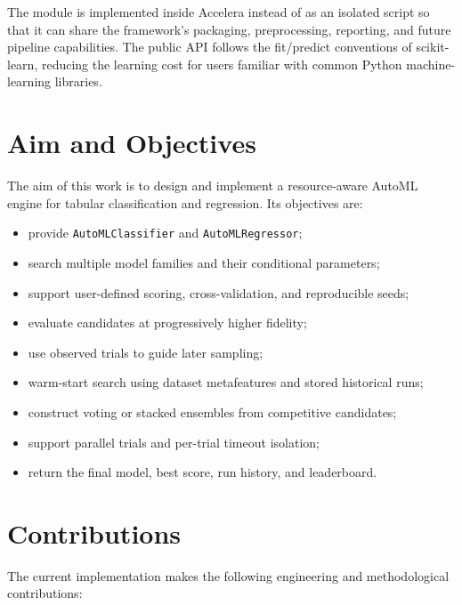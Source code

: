 \documentclass[12pt,a4paper,oneside]{report}
\begin{document}
\medskip
\noindent The module is implemented inside Accelera instead of as an isolated script so
that it can share the framework's packaging, preprocessing, reporting, and
future pipeline capabilities. The public API follows the fit/predict conventions
of scikit-learn, reducing the learning cost for users familiar with common
Python machine-learning libraries.

\section{Aim and Objectives}

The aim of this work is to design and implement a resource-aware AutoML engine
for tabular classification and regression. Its objectives are:

\begin{itemize}[leftmargin=*]
  \item provide \texttt{AutoMLClassifier} and \texttt{AutoMLRegressor};
  \item search multiple model families and their conditional parameters;
  \item support user-defined scoring, cross-validation, and reproducible seeds;
  \item evaluate candidates at progressively higher fidelity;
  \item use observed trials to guide later sampling;
  \item warm-start search using dataset metafeatures and stored historical runs;
  \item construct voting or stacked ensembles from competitive candidates;
  \item support parallel trials and per-trial timeout isolation;
  \item return the final model, best score, run history, and leaderboard.
\end{itemize}

\section{Contributions}

The current implementation makes the following engineering and methodological
contributions:
\end{document}
